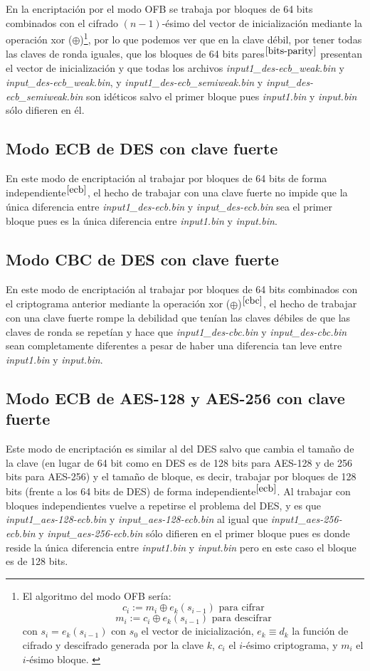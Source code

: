 \documentclass[a4paper, 11pt]{article}
\begin{document}
		En la encriptación por el modo OFB se trabaja por bloques de 64 bits combinados con el cifrado $(n-1)$-ésimo del vector
		de inicialización mediante la operación xor ($\oplus$)\footnote{El algoritmo del modo OFB sería: \[c_i := m_i \oplus
		e_k(s_{i-1}) \text{ para cifrar}\] \[m_i := c_i \oplus e_k(s_{i-1}) \text{ para descifrar}\] con $s_i = e_k(s_{i-1})$
		con $s_0$ el vector de inicialización, $e_k \equiv d_k$ la función de cifrado y descifrado generada por la clave $k$,
		$c_i$ el $i$-ésimo criptograma, y $m_i$ el $i$-ésimo bloque. \label{ofb}}, por lo que podemos ver que en la clave débil,
		por tener todas las claves de ronda iguales, que los bloques de 64 bits pares$^{\ref{bits-parity}}$ presentan el vector
		de inicialización y que todas los archivos \textit{input1\_des-ecb\_weak.bin} y \textit{input\_des-ecb\_weak.bin}, y
		\textit{input1\_des-ecb\_semiweak.bin} y \textit{input\_des-ecb\_semiweak.bin} son idéticos salvo el primer bloque
		pues \textit{input1.bin} y \textit{input.bin} sólo difieren en él.
				
	\subsection{Modo ECB de DES con clave fuerte}
		En este modo de encriptación al trabajar por bloques de 64 bits de forma independiente$^{\ref{ecb}}$, el hecho de trabajar
		con una clave fuerte no impide que la única diferencia entre \textit{input1\_des-ecb.bin} y \textit{input\_des-ecb.bin}
		sea el primer bloque pues es la única diferencia entre \textit{input1.bin} y \textit{input.bin}.
		
	\subsection{Modo CBC de DES con clave fuerte}
		En este modo de encriptación al trabajar por bloques de 64 bits combinados con el criptograma anterior mediante
		la operación xor ($\oplus$)$^{\ref{cbc}}$, el hecho de trabajar con una clave fuerte rompe la debilidad que tenían las
		claves débiles de que las claves de ronda se repetían y hace que \textit{input1\_des-cbc.bin} y \textit{input\_des-cbc.bin}
		sean completamente diferentes a pesar de haber una diferencia tan leve entre \textit{input1.bin} y \textit{input.bin}.
		
	\subsection{Modo ECB de AES-128 y AES-256 con clave fuerte}
		Este modo de encriptación es similar al del DES salvo que cambia el tamaño de la clave (en lugar de 64 bit como en
		DES es de 128 bits para AES-128 y de 256 bits para AES-256) y el tamaño de bloque, es decir, trabajar por bloques
		de 128 bits (frente a los 64 bits de DES) de forma independiente$^{\ref{ecb}}$. Al trabajar con bloques independientes
		vuelve a repetirse el problema del DES, y es que \textit{input1\_aes-128-ecb.bin} y \textit{input\_aes-128-ecb.bin}
		al igual que \textit{input1\_aes-256-ecb.bin} y \textit{input\_aes-256-ecb.bin} sólo difieren en el primer bloque
		pues es donde reside la única diferencia entre \textit{input1.bin} y \textit{input.bin} pero en este caso el bloque
		es de 128 bits.
		
\end{document}

